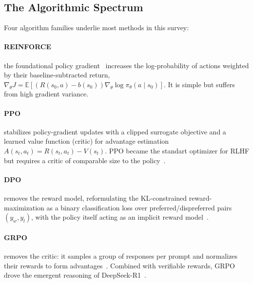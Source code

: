 \subsection{The Algorithmic Spectrum}\label{sec:background-algos}

Four algorithm families underlie most methods in this survey:


\paragraph{REINFORCE} the foundational policy
gradient~\cite{williams1992reinforce,sutton2018rl} increases the
log-probability of actions weighted by their baseline-subtracted
return,
$\nabla_\theta J=\mathbb{E}[(R(s_0,a)-b(s_0))\nabla_\theta\log\pi_\theta(a\mid s_0)]$.
It is simple but suffers from high gradient variance.

\paragraph{PPO}
stabilizes policy-gradient updates with a clipped surrogate objective and
a learned value function (critic) for advantage estimation
$A(s_t,a_t)=R(s_t,a_t)-V(s_t)$. PPO became the standart optimizer for RLHF but
requires a critic of comparable size to the policy~\cite{schulman2017ppo}.

\paragraph{DPO}
removes the reward model, reformulating the
KL-constrained reward-maximization as a binary classification loss over
preferred/dispreferred pairs $(y_w,y_l)$, with the policy itself acting
as an implicit reward model~\cite{rafailov2023dpo}.

\paragraph{GRPO}
removes the critic: it samples a group of responses per prompt and
normalizes their rewards to form advantages~\cite{shao2024deepseekmath}. Combined
with verifiable rewards, GRPO drove the emergent reasoning of
DeepSeek-R1~\cite{guo2025deepseekr1}.
